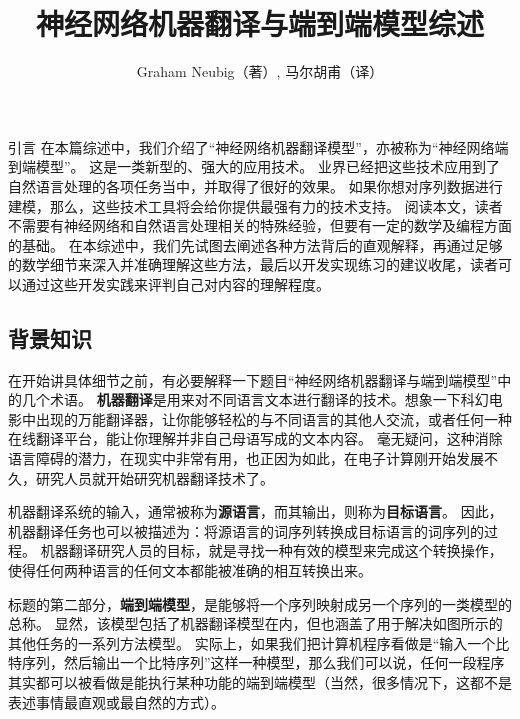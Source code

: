 \documentclass[10pt,a4paper]{ctexart}
\title{神经网络机器翻译与端到端模型综述}
\author{Graham Neubig（著）, 马尔胡甫（译）}
\date{}
\makeatletter
\renewcommand{\section}{\@startsection{section}{1}{0mm}
  {-\baselineskip}{0.5\baselineskip}{\bf\leftline}}
\makeatother
\begin{document}
\maketitle

\newpage

\tableofcontents

\newpage

\section{引言}
在本篇综述中，我们介绍了“神经网络机器翻译模型”，亦被称为“神经网络端到端模型”。
这是一类新型的、强大的应用技术。
业界已经把这些技术应用到了自然语言处理的各项任务当中，并取得了很好的效果。
如果你想对序列数据进行建模，那么，这些技术工具将会给你提供最强有力的技术支持。
阅读本文，读者不需要有神经网络和自然语言处理相关的特殊经验，但要有一定的数学及编程方面的基础。
在本综述中，我们先试图去阐述各种方法背后的直观解释，再通过足够的数学细节来深入并准确理解这些方法，最后以开发实现练习的建议收尾，读者可以通过这些开发实践来评判自己对内容的理解程度。

\subsection{背景知识}
在开始讲具体细节之前，有必要解释一下题目“神经网络机器翻译与端到端模型”中的几个术语。
\textbf{机器翻译}是用来对不同语言文本进行翻译的技术。想象一下科幻电影中出现的万能翻译器，让你能够轻松的与不同语言的其他人交流，或者任何一种在线翻译平台，能让你理解并非自己母语写成的文本内容。
毫无疑问，这种消除语言障碍的潜力，在现实中非常有用，也正因为如此，在电子计算刚开始发展不久，研究人员就开始研究机器翻译技术了。

机器翻译系统的输入，通常被称为\textbf{源语言}，而其输出，则称为\textbf{目标语言}。
因此，机器翻译任务也可以被描述为：将源语言的词序列转换成目标语言的词序列的过程。
机器翻译研究人员的目标，就是寻找一种有效的模型来完成这个转换操作，使得任何两种语言的任何文本都能被准确的相互转换出来。

标题的第二部分，\textbf{端到端模型}，是能够将一个序列映射成另一个序列的一类模型的总称。
显然，该模型包括了机器翻译模型在内，但也涵盖了用于解决如图所示的其他任务的一系列方法模型。
实际上，如果我们把计算机程序看做是“输入一个比特序列，然后输出一个比特序列”这样一种模型，那么我们可以说，任何一段程序其实都可以被看做是能执行某种功能的端到端模型（当然，很多情况下，这都不是表述事情最直观或最自然的方式）。
\end{document}
